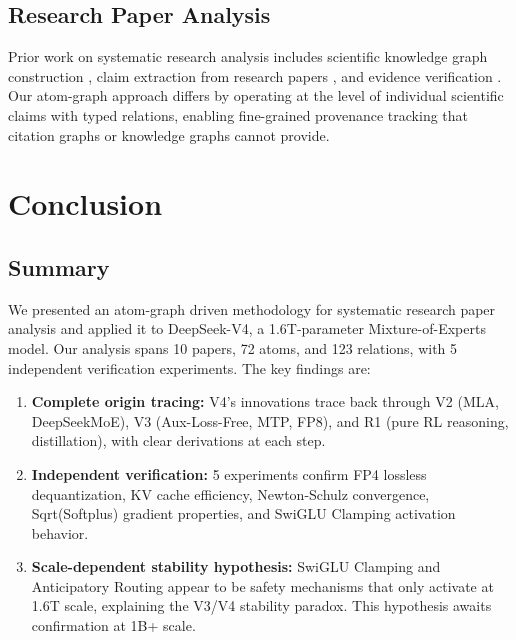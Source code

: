 \documentclass[11pt,a4paper]{article}
\begin{document}
\subsection{Research Paper Analysis}

Prior work on systematic research analysis includes scientific knowledge graph construction \cite{auer2023}, claim extraction from research papers \cite{wei2020}, and evidence verification \cite{thorne2018}. Our atom-graph approach differs by operating at the level of individual scientific claims with typed relations, enabling fine-grained provenance tracking that citation graphs or knowledge graphs cannot provide.

\section{Conclusion}
\label{sec:conclusion}

\subsection{Summary}

We presented an atom-graph driven methodology for systematic research paper analysis and applied it to DeepSeek-V4, a 1.6T-parameter Mixture-of-Experts model. Our analysis spans 10 papers, 72 atoms, and 123 relations, with 5 independent verification experiments. The key findings are:

\begin{enumerate}
    \item \textbf{Complete origin tracing:} V4's innovations trace back through V2 (MLA, DeepSeekMoE), V3 (Aux-Loss-Free, MTP, FP8), and R1 (pure RL reasoning, distillation), with clear derivations at each step.
    
    \item \textbf{Independent verification:} 5 experiments confirm FP4 lossless dequantization, KV cache efficiency, Newton-Schulz convergence, Sqrt(Softplus) gradient properties, and SwiGLU Clamping activation behavior.
    
    \item \textbf{Scale-dependent stability hypothesis:} SwiGLU Clamping and Anticipatory Routing appear to be safety mechanisms that only activate at 1.6T scale, explaining the V3/V4 stability paradox. This hypothesis awaits confirmation at 1B+ scale.
\end{enumerate}
\end{document}
